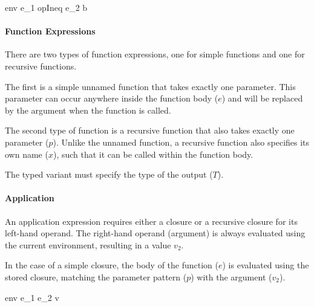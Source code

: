 \documentclass{article}
\begin{document}
    {\mbox{env} \vdash e_1 \; opIneq \; e_2 \Downarrow b}

\paragraph{Function Expressions}

There are two types of function expressions, one for simple functions and one for recursive functions.

\smallskip

The first is a simple unnamed function that takes exactly one parameter.
This parameter can occur anywhere inside the function body ($e$) and will be replaced by the argument when the function is called.


The second type of function is a recursive function that also takes exactly one parameter ($p$).
Unlike the unnamed function, a recursive function also specifies its own name ($x$), such that it can be called within the function body.

The typed variant must specify the type of the output ($T$).



\paragraph{Application}
An application expression requires either a closure or a recursive closure for its left-hand operand.
The right-hand operand (argument) is always evaluated using the current environment, resulting in a value $v_2$.
\smallskip

In the case of a simple closure, the body of the function ($e$) is evaluated using the stored closure, matching the parameter pattern ($p$) with the argument ($v_2$).

    {\mbox{env} \vdash e_1 \; e_2 \Downarrow v}
\end{document}
